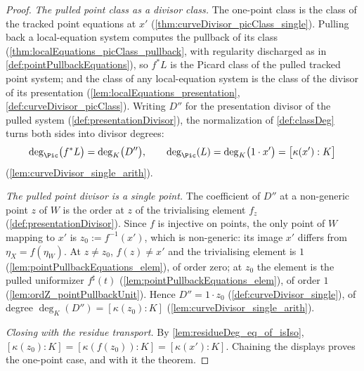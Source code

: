 \begin{proof}
  \emph{The pulled point class as a divisor class.} The one-point class is the class
  of the tracked point equations at \(x'\)
  (\ref{thm:curveDivisor_picClass_single}). Pulling back a local-equation system
  computes the pullback of its class (\ref{thm:localEquations_picClass_pullback}, with
  regularity discharged as in \ref{def:pointPullbackEquations}), so \(f^{*}L\) is the
  Picard class of the pulled tracked point system; and the class of any local-equation
  system is the class of the divisor of its presentation
  (\ref{lem:localEquations_presentation}, \ref{def:curveDivisor_picClass}). Writing
  \(D''\) for the presentation divisor of the pulled system
  (\ref{def:presentationDivisor}), the normalization of \ref{def:classDeg} turns both
  sides into divisor degrees:
  \[
    \deg_{\Pic}\bigl(f^{*}L\bigr) = \deg_{K}\bigl(D''\bigr), \qquad
    \deg_{\Pic}(L) = \deg_{K}\bigl(1 \cdot x'\bigr) = \bigl[\kappa(x') : K\bigr]
  \]
  (\ref{lem:curveDivisor_single_arith}).

  \emph{The pulled point divisor is a single point.} The coefficient of \(D''\) at a
  non-generic point \(z\) of \(W\) is the order at \(z\) of the trivialising element
  \(f_z\) (\ref{def:presentationDivisor}). Since \(f\) is injective on points, the
  only point of \(W\) mapping to \(x'\) is \(z_0 := f^{-1}(x')\), which is
  non-generic: its image \(x'\) differs from \(\eta_X = f(\eta_W)\). At \(z \neq
  z_0\), \(f(z) \neq x'\) and the trivialising element is \(1\)
  (\ref{lem:pointPullbackEquations_elem}), of order zero; at \(z_0\) the element is
  the pulled uniformizer \(f^{\sharp}(t)\) (\ref{lem:pointPullbackEquations_elem}), of
  order \(1\) (\ref{lem:ordZ_pointPullbackUnit}). Hence \(D'' = 1 \cdot z_0\)
  (\ref{def:curveDivisor_single}), of degree
  \(\deg_{K}(D'') = [\kappa(z_0) : K]\) (\ref{lem:curveDivisor_single_arith}).

  \emph{Closing with the residue transport.} By
  \ref{lem:residueDeg_eq_of_isIso},
  \([\kappa(z_0) : K] = [\kappa(f(z_0)) : K] = [\kappa(x') : K]\). Chaining the
  displays proves the one-point case, and with it the theorem.
\end{proof}

